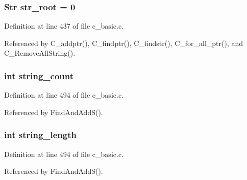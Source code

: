 \subsubsection{\setlength{\rightskip}{0pt plus 5cm}\bf{Str} \bf{str\_\-root} = 0\hspace{0.3cm}{\tt  [static]}}\label{c__basic_8c_85074b288492780239446ae8d81951ee}




Definition at line 437 of file c\_\-basic.c.

Referenced by C\_\-addptr(), C\_\-findptr(), C\_\-findstr(), C\_\-for\_\-all\_\-ptr(), and C\_\-Remove\-All\-String().
\subsubsection{\setlength{\rightskip}{0pt plus 5cm}int \bf{string\_\-count}\hspace{0.3cm}{\tt  [static]}}\label{c__basic_8c_fd46a47dbbc5944b6360ffb0a76b364e}




Definition at line 494 of file c\_\-basic.c.

Referenced by Find\-And\-Add\-S().
\subsubsection{\setlength{\rightskip}{0pt plus 5cm}int \bf{string\_\-length}\hspace{0.3cm}{\tt  [static]}}\label{c__basic_8c_7ed23e172ed4f3fa8180869bc1e4be0a}




Definition at line 494 of file c\_\-basic.c.

Referenced by Find\-And\-Add\-S().